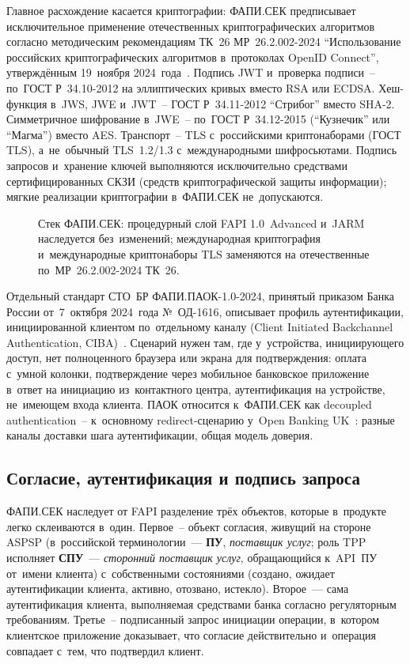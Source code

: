 Главное расхождение касается криптографии: ФАПИ.СЕК предписывает
исключительное применение отечественных криптографических
алгоритмов согласно методическим рекомендациям ТК~26
МР~26.2.002-2024 \enquote{Использование российских криптографических
алгоритмов в~протоколах OpenID Connect}, утверждённым
19~ноября 2024~года~\cite{tc26-mr-26-2-002-2024}. Подпись
JWT и~проверка подписи~-- по~ГОСТ Р~34.10-2012 на эллиптических
кривых вместо RSA или ECDSA. Хеш-функция в~JWS, JWE и~JWT~--
ГОСТ Р~34.11-2012 \enquote{Стрибог} вместо SHA-2. Симметричное шифрование
в~JWE~-- по~ГОСТ Р~34.12-2015 (\enquote{Кузнечик} или \enquote{Магма}) вместо
AES. Транспорт~-- TLS с~российскими криптонаборами (ГОСТ TLS),
а~не~обычный TLS~1.2/1.3 с~международными шифросьютами. Подпись
запросов и~хранение ключей выполняются исключительно средствами
сертифицированных СКЗИ (средств криптографической защиты информации);
мягкие реализации криптографии в~ФАПИ.СЕК не~допускаются.

\begin{figure}[tbp]
  \centering
  \caption{Стек ФАПИ.СЕК: процедурный слой FAPI 1.0~Advanced
  и~JARM наследуется без~изменений; международная криптография
  и~международные криптонаборы TLS заменяются на отечественные
  по~МР~26.2.002-2024 ТК~26.}\label{fig:fapi-sec-stack}
\end{figure}

Отдельный стандарт СТО~БР ФАПИ.ПАОК-1.0-2024, принятый приказом
Банка России от~7~октября 2024~года №~ОД-1616, описывает
профиль аутентификации, инициированной клиентом по~отдельному
каналу (Client Initiated Backchannel Authentication,
CIBA)~\cite{fapi-paok-2024}. Сценарий нужен там,
где у~устройства, инициирующего доступ, нет полноценного
браузера или экрана для подтверждения: оплата с~умной колонки,
подтверждение через мобильное банковское приложение в~ответ
на инициацию из~контактного центра, аутентификация на устройстве,
не~имеющем входа клиента. ПАОК относится к~ФАПИ.СЕК как decoupled
authentication~-- к~основному redirect-сценарию у~Open Banking
UK~\cite{openbanking-uk-authentication-methods}: разные каналы
доставки шага аутентификации, общая модель доверия.

\subsection*{Согласие, аутентификация и подпись запроса}

ФАПИ.СЕК наследует от FAPI разделение трёх объектов, которые
в~продукте легко склеиваются в~один. Первое~-- объект согласия,
живущий на стороне ASPSP (в~российской терминологии~--- \textbf{ПУ},
\textit{поставщик услуг}; роль TPP исполняет \textbf{СПУ}~--- \textit{сторонний
поставщик услуг}, обращающийся к~API~ПУ от~имени клиента)
с~собственными состояниями (создано, ожидает
аутентификации клиента, активно, отозвано, истекло).
Второе~--- сама аутентификация клиента, выполняемая средствами
банка согласно регуляторным требованиям.
Третье~-- подписанный запрос инициации операции, в~котором
клиентское приложение доказывает, что согласие действительно
и~операция совпадает с~тем, что подтвердил клиент.

